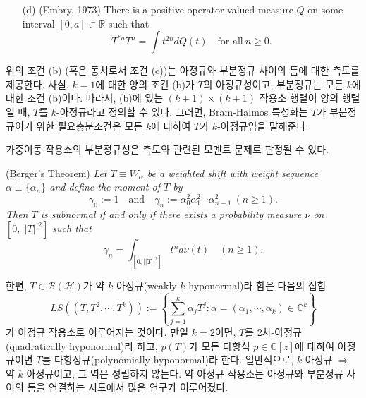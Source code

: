 \documentclass[12pt,a4paper,2sided]{article}
\newcommand{\vs}{\vspace}
\begin{document}
\newpage

 \vspace{.4 cm}

{\sl \begin{itemize}
\item[\rm(d)] {\rm (Embry, 1973)}  There is a positive
operator-valued measure $Q$ on some interval $[0,a]\subset
\mathbb{R}$ such that
$$
T^{*n}T^n=\int t^{2n} dQ(t)\quad\text{for all}\ n\ge 0.
$$
\end{itemize}}

위의 조건 (b) (혹은 동치로서 조건 (c))는 아정규와 부분정규 사이의
틈에 대한 측도를 제공한다. 사실, $k=1$에 대한 양의 조건 (b)가 $T$의
아정규성이고, 부분정규는 모든 $k$에 대한 조건 (b)이다. 따라서, (b)에
있는 $(k+1)\times (k+1)$ 작용소 행렬이 양의 행렬일 때, $T$를
$k$-아정규라고 정의할 수 있다. 그러면, Bram-Halmos 특성화는 $T$가
부분정규이기 위한 필요충분조건은 모든 $k$에 대하여 $T$가
$k$-아정규임을 말해준다.

가중이동 작용소의 부분정규성은 측도와 관련된 모멘트 문제로 판정될 수 있다.

\vs{0.2cm}{\bf Proposition 2.0.2.} {\rm (Berger's
Theorem)}\label{thm3.6} {\sl Let $T\equiv W_\alpha$ be a weighted
shift with weight sequence $\alpha\equiv\{\alpha_n\}$ and define the
moment of $T$ by
$$
\gamma_0:=1\quad\text{and}\quad \gamma_n:=\alpha_0^2\alpha_1^2\cdots \alpha_{n-1}^2\ (n\ge 1).
$$
Then $T$ is subnormal if and only if there exists a probability
measure $\nu$ on $[0,||T||^2]$ such that}
\begin{equation}\label{2.0.1}
\gamma_n=\int_{[0,||T||^2]} t^{n} d\nu(t)\quad (n\ge 1).
\end{equation}

\vs{0.2cm} 한편,  $T\in\mathcal{B(H)}$가 {약 $k$-아정규}(weakly
$k$-hyponormal)라 함은 다음의 집합
$$
LS((T,T^2,\cdots,T^k)):=\left\{\sum_{j=1}^k \alpha_jT^j: \alpha=
(\alpha_1,\cdots,\alpha_k)\in {\mathbb C}^k\right\}
$$
가 아정규 작용소로 이루어지는 것이다. 만일 $k=2$이면, $T$를
2차-아정규 (quadratically hyponormal)라 하고, $p(T)$가 모든 다항식
$p\in{\mathbb C}[z]$에 대하여 아정규이면 $T$를 다항정규(polynomially
hyponormal)라 한다. 일반적으로, $k$-아정규 $\Rightarrow$ 약
$k$-아정규이고, 그 역은 성립하지 않는다. 약-아정규 작용소는 아정규와
부분정규 사이의 틈을 연결하는 시도에서 많은 연구가 이루어졌다.

\newpage{}
\end{document}
